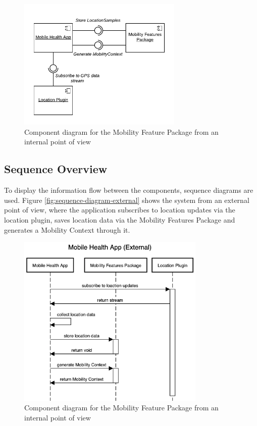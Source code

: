 \begin{figure}[h]
\centering
\includegraphics[width=0.7\textwidth]{images/diagrams/component-external.pdf}
\caption{Component diagram for the Mobility Feature Package from an internal point of view}
\label{fig:component-diagram-external}
\end{figure}


\subsection{Sequence Overview}
To display the information flow between the components, sequence diagrams are used. Figure \ref{fig:sequence-diagram-external} shows the system from an external point of view, where the application subscribes to location updates via the location plugin, saves location data via the Mobility Features Package and generates a Mobility Context through it. 

\begin{figure}[h]
\centering
\includegraphics[width=0.8\textwidth]{images/diagrams/sequence-external.png}
\caption{Component diagram for the Mobility Feature Package from an internal point of view}
\label{fig:sequence-diagram-internal}
\end{figure}

